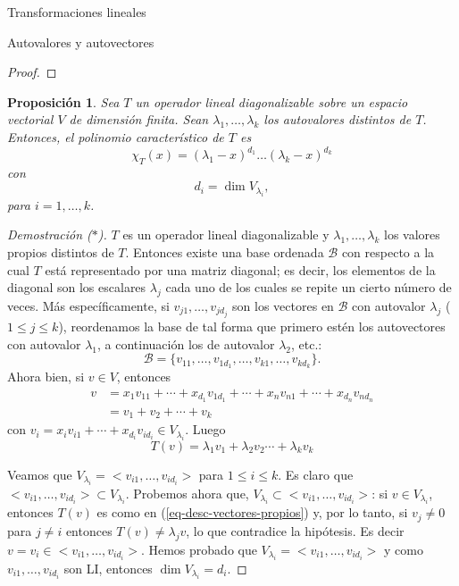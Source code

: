 \documentclass[a4paper,12pt,twoside,spanish,reqno]{amsbook}
\numberwithin{equation}{section}
\newtheorem{proposicion}[teorema]{Proposici\'on}
\theoremstyle{definition}
\theoremstyle{remark}
\begin{document}
\begin{chapter}{Transformaciones lineales}
\begin{section}{Autovalores y autovectores}
\begin{proof}
        \end{proof}
    
        \begin{proposicion}
             Sea $T$ un operador lineal diagonalizable sobre un espacio vectorial $V$ de dimensión finita. Sean $\lambda_1,\ldots,\lambda_k$ los autovalores distintos de $T$. Entonces,  el  polinomio característico de $T$ es
                 $$
                 \chi_T(x) = (\lambda_1 -x)^{d_1}\ldots(\lambda_k- x)^{d_k}
                 $$
                 con
                 $$
                 d_i =  \dim V_{\lambda_i},
                 $$
                 para  $i=1, \ldots, k$.
        \end{proposicion}
        \begin{proof}[Demostración ($*$)]
            $T$ es un operador lineal diagonalizable y $\lambda_1,\ldots,\lambda_k$ los valores propios distintos de $T$. Entonces existe una base ordenada $\mathcal B$ con respecto a la cual $T$ está representado por una matriz diagonal; es decir, los elementos de la diagonal son los escalares $\lambda_j$ cada uno de los cuales se repite un cierto número de veces. Más específicamente, si
             $v_{j1},\ldots,v_{jd_j}$ son los vectores en $\mathcal{B}$ con autovalor $\lambda_j$ ($1 \le j \le k$),  reordenamos la base de tal forma que primero estén los autovectores con autovalor $\lambda_1$, a continuación los de autovalor $\lambda_2$, etc.: 
            \begin{equation*}
                \mathcal{B} = \{v_{11},\ldots,v_{1d_1},\ldots,v_{k1},\ldots,v_{kd_k}\}. 
            \end{equation*}
            Ahora bien,  si $v \in V$,  entonces 
            \begin{align*}
            v &=x_1v_{11}+\cdots+x_{d_1}v_{1d_1}+\cdots+x_nv_{n1}+\cdots+x_{d_n}v_{nd_n} \\
            &= v_1 + v_2 +\cdots + v_k
            \end{align*}
            con $v_i = x_iv_{i1}+\cdots+x_{d_i}v_{id_i} \in V_{\lambda_i}$. Luego
            \begin{equation}\label{eq-desc-vectores-propios}
                T(v)  =\lambda_1v_1+\lambda_2v_2\cdots+\lambda_kv_k
            \end{equation} 
            
            Veamos que $V_{\lambda_i} = <v_{i1},\ldots,v_{id_i}>$ para $1 \le i \le k$. Es claro que  $<v_{i1},\ldots,v_{id_i}> \subset V_{\lambda_i}$. Probemos  ahora que,  $V_{\lambda_i} \subset <v_{i1},\ldots,v_{id_i}>$: si  $v \in V_{\lambda_i}$,  entonces $T(v)$ es como en (\ref{eq-desc-vectores-propios}) y, por lo tanto, si $v_j \ne 0$ para $j\not=i$ entonces $T(v) \ne \lambda_j v$, lo que contradice la hipótesis. Es decir $v = v_i \in <v_{i1},\ldots,v_{id_i}>$. Hemos probado que    $V_{\lambda_i} = <v_{i1},\ldots,v_{id_i}>$ y como $v_{i1},\ldots,v_{id_i}$ son LI, entonces $\dim V_{\lambda_i} = d_i$.
            

\end{proof}
\end{section}
\end{chapter}
\end{document}
